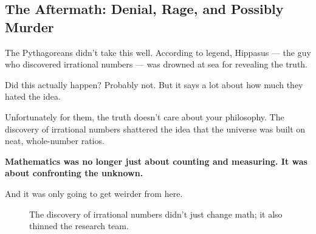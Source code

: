 \subsection{The Aftermath: Denial, Rage, and Possibly Murder}

The Pythagoreans didn’t take this well. According to legend, Hippasus --- the guy who discovered irrational numbers --- was drowned at sea for revealing the truth.

Did this actually happen? Probably not. But it says a lot about how much they hated the idea.  

Unfortunately for them, the truth doesn’t care about your philosophy. The discovery of irrational numbers shattered the idea that the universe was built on neat, whole-number ratios.  

\textbf{Mathematics was no longer just about counting and measuring. It was about confronting the unknown.}  

And it was only going to get weirder from here.

\begin{figure}[H]
\centering
{}
\caption{The discovery of irrational numbers didn’t just change math; it also thinned the research team.}
\end{figure}

